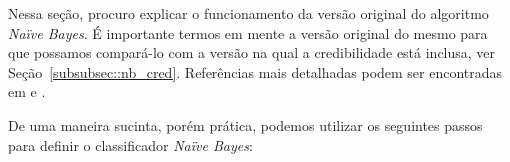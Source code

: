 

Nessa seção, procuro explicar o funcionamento da versão original do algoritmo \textit{Naïve Bayes}. É importante termos em mente a versão original do mesmo para que possamos compará-lo com a versão na qual a credibilidade está inclusa, ver Seção~\ref{subsubsec::nb_cred}. Referências mais detalhadas podem ser encontradas em \cite{DHS01} e \cite{Manning08}.

De uma maneira sucinta, porém prática, podemos utilizar os seguintes passos para definir o classificador \textit{Naïve Bayes}:

